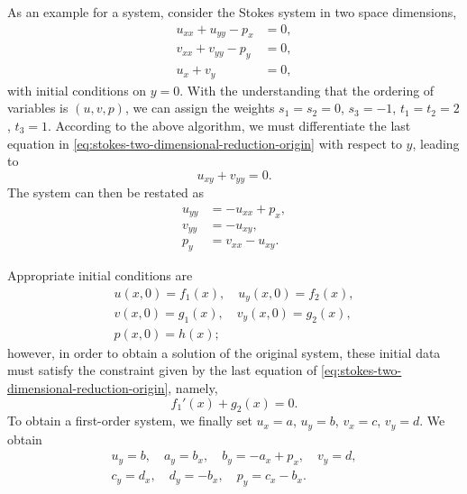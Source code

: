 \begin{Example}\label{ex:stokes-general-reduction}As an example for a system, consider the Stokes system in two space dimensions,
\begin{equation}\label{eq:stokes-two-dimensional-reduction-origin}
\begin{aligned}
u_{xx}+u_{yy}-p_x&=0,\\v_{xx}+v_{yy}-p_y&=0,\\u_x+v_y&=0,
\end{aligned}
\end{equation}
with initial conditions on $y=0$. With the understanding that the ordering of variables is $(u,v,p)$, we can assign the weights $s_1=s_2=0$, $s_3=-1$, $t_1=t_2=2$, $t_3=1$. According to the above algorithm, we must differentiate the last equation in \eqref{eq:stokes-two-dimensional-reduction-origin} with respect to $y$, leading to
\begin{equation}\label{eq:stokes-differentiated-divergence}
u_{xy}+v_{yy}=0.
\end{equation}
The system can then be restated as
\begin{equation}\label{eq:stokes-normal-solved-system}
\begin{aligned}
u_{yy}&=-u_{xx}+p_x,\\v_{yy}&=-u_{xy},\\p_y&=v_{xx}-u_{xy}.
\end{aligned}
\end{equation}


Appropriate initial conditions are
\begin{equation}\label{eq:stokes-reduction-initial-data}
\begin{gathered}
u(x,0)=f_1(x),\quad u_y(x,0)=f_2(x),\\
v(x,0)=g_1(x),\quad v_y(x,0)=g_2(x),\\
p(x,0)=h(x);
\end{gathered}
\end{equation}
however, in order to obtain a solution of the original system, these initial data must satisfy the constraint given by the last equation of \eqref{eq:stokes-two-dimensional-reduction-origin}, namely,
\begin{equation}\label{eq:stokes-reduction-initial-constraint}
f_1'(x)+g_2(x)=0.
\end{equation}
To obtain a first-order system, we finally set $u_x=a$, $u_y=b$, $v_x=c$, $v_y=d$. We obtain
\begin{equation}\label{eq:stokes-first-order-reduction}
\begin{gathered}
u_y=b,\quad a_y=b_x,\quad b_y=-a_x+p_x,\quad v_y=d,\\
c_y=d_x,\quad d_y=-b_x,\quad p_y=c_x-b_x.
\end{gathered}
\end{equation}
\end{Example}
